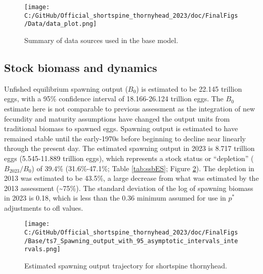 \documentclass[11pt,
  english,
  letterpaper,
]{article}
\begin{document}
\begin{figure}
\centering
\texttt{[image: C:/GitHub/Official\_shortspine\_thornyhead\_2023/doc/FinalFigs/Data/data\_plot.png]}
\caption{Summary of data sources used in the base model.\label{fig:assessment_data_timeseriesES}}
\end{figure}

\hypertarget{stock-biomass-and-dynamics}{%
\subsection*{Stock biomass and dynamics}\label{stock-biomass-and-dynamics}}

Unfished equilibrium spawning output (\(B_0\)) is estimated to be 22.145 trillion eggs, with a 95\% confidence interval of 18.166-26.124 trillion eggs. The \(B_0\) estimate here is not comparable to previous assessment as the integration of new fecundity and maturity assumptions have changed the output units from traditional biomass to spawned eggs. Spawning output is estimated to have remained stable until the early-1970s before beginning to decline near linearly through the present day. The estimated spawning output in 2023 is 8.717 trillion eggs (5.545-11.889 trillion eggs), which represents a stock status or ``depletion'' (\(B_{2023}/B_0\)) of 39.4\% (31.6\%-47.1\%; Table \ref{tab:ssbES}; Figure \ref{fig:ssb_trajectoryES}). The depletion in 2013 was estimated to be 43.5\%, a large decrease from what was estimated by the 2013 assessment (\textasciitilde75\%). The standard deviation of the log of spawning biomass in 2023 is 0.18, which is less than the 0.36 minimum assumed for use in \(p^*\) adjustments to \gls{ofl} values.

\begin{figure}
\centering
\texttt{[image: C:/GitHub/Official\_shortspine\_thornyhead\_2023/doc/FinalFigs/Base/ts7\_Spawning\_output\_with\_95\_asymptotic\_intervals\_intervals.png]}
\caption{Estimated spawning output trajectory for shortspine thornyhead.\label{fig:ssb_trajectoryES}}
\end{figure}

\begingroup\fontsize{10}{12}\selectfont
\begingroup\fontsize{10}{12}\selectfont
\end{document}
